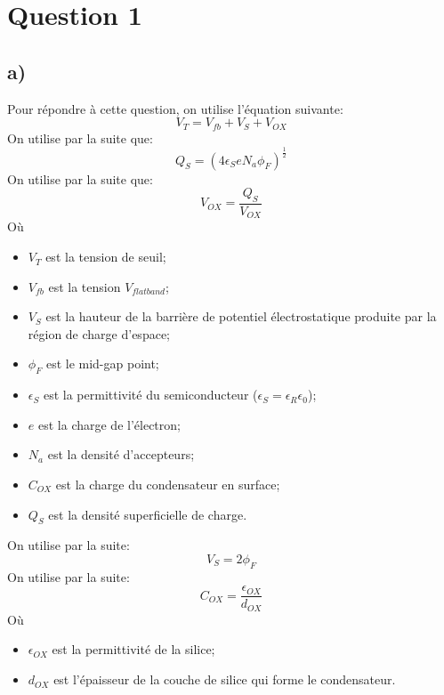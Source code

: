 



\label{s:experimentation}
\chapter*{Question 1}
\section*{a)}
Pour répondre à cette question, on utilise l'équation suivante:
\begin{equation}
V_T = V_{fb} + V_S + V_{OX}
\end{equation}
On utilise par la suite que:
\begin{equation}
Q_S = (4\epsilon_S eN_a \phi_F)^{\frac{1}{2}}
\end{equation}
On utilise par la suite que:
\begin{equation}
V_{OX} = \frac{Q_S}{V_{OX}}
\end{equation}
Où
\begin{itemize}
\item $V_T$ est la tension de seuil;
\item $V_{fb}$ est la tension $V_{flat band}$;
\item $V_S$ est la hauteur de la barrière de potentiel électrostatique produite par la région de charge d'espace;
\item $\phi_F$ est le mid-gap point;
\item $\epsilon_S$ est la permittivité du semiconducteur ($\epsilon_S = \epsilon_R \epsilon_0$);
\item $e$ est la charge de l'électron;
\item $N_a$ est la densité d'accepteurs;
\item $C_{OX}$ est la charge du condensateur en surface;
\item $Q_S$ est la densité superficielle de charge.
\end{itemize}
On utilise par la suite:
\begin{equation}
V_{S} = 2\phi_F
\end{equation}
On utilise par la suite:
\begin{equation}
C_{OX} = \frac{\epsilon_{OX}}{d_{OX}}
\end{equation}
Où
\begin{itemize}
\item $\epsilon_{OX}$ est la permittivité de la silice;
\item $d_{OX}$ est l'épaisseur de la couche de silice qui forme le condensateur.
\end{itemize}

